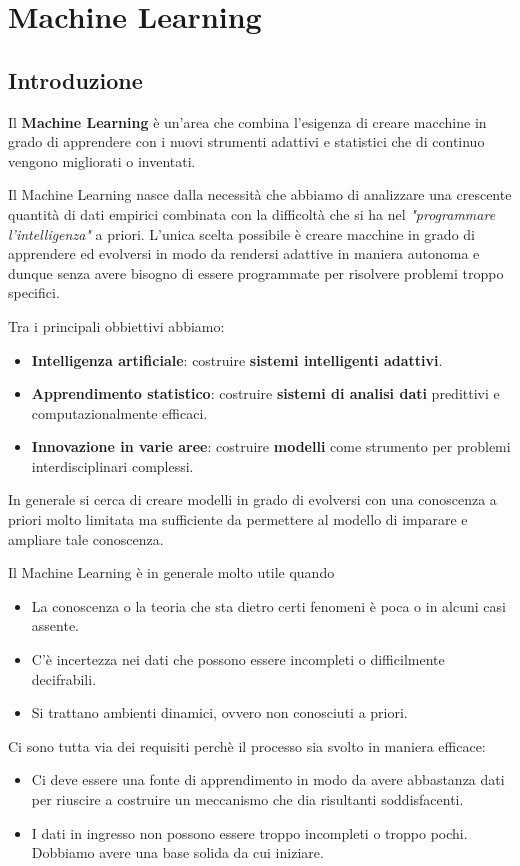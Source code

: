 \part{Machine Learning}
\chapter{Introduzione}
Il \textbf{Machine Learning} \`e un'area che combina l'esigenza di creare macchine in grado di apprendere con i nuovi
strumenti adattivi e statistici che di continuo vengono migliorati o inventati.

Il Machine Learning nasce dalla necessit\`a che abbiamo di analizzare una crescente quantit\`a di dati empirici combinata
con la difficolt\`a che si ha nel \emph{"programmare l'intelligenza"} a priori. L'unica scelta possibile \`e creare
macchine in grado di apprendere ed evolversi in modo da rendersi adattive in maniera autonoma e dunque senza avere bisogno
di essere programmate per risolvere problemi troppo specifici.

Tra i principali obbiettivi abbiamo:
\begin{itemize}
	\item \textbf{Intelligenza artificiale}: costruire \textbf{sistemi intelligenti adattivi}.
	\item \textbf{Apprendimento statistico}: costruire \textbf{sistemi di analisi dati} predittivi e computazionalmente
	      efficaci.
	\item \textbf{Innovazione in varie aree}: costruire \textbf{modelli} come strumento per problemi interdisciplinari
	      complessi.
\end{itemize}
In generale si cerca di creare modelli in grado di evolversi con una conoscenza a priori molto limitata ma sufficiente
da permettere al modello di imparare e ampliare tale conoscenza.

Il Machine Learning \`e in generale molto utile quando
\begin{itemize}
	\item La conoscenza o la teoria che sta dietro certi fenomeni \`e poca o in alcuni casi assente.
	\item C'\`e incertezza nei dati che possono essere incompleti o difficilmente decifrabili.
	\item Si trattano ambienti dinamici, ovvero non conosciuti a priori.
\end{itemize}

Ci sono tutta via dei requisiti perch\`e il processo sia svolto in maniera efficace:
\begin{itemize}
	\item Ci deve essere una fonte di apprendimento in modo da avere abbastanza dati per riuscire a costruire un
	      meccanismo che dia risultanti soddisfacenti.
	\item I dati in ingresso non possono essere troppo incompleti o troppo pochi. Dobbiamo avere una base solida da
	      cui iniziare.
\end{itemize}

